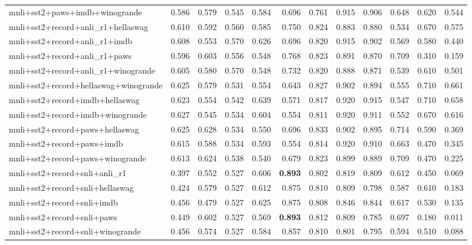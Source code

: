 \begin{table}[t]
\begin{tabular}{lrrrrrrrrrrr}
    mnli+sst2+paws+imdb+winogrande & 0.586 & 0.579 & 0.545 & 0.584 & 0.696 & 0.761 & 0.915 & 0.906 & 0.648 & 0.620 & 0.544 \\
    mnli+sst2+record+anli\_r1+hellaswag & 0.610 & 0.592 & 0.560 & 0.585 & 0.750 & 0.824 & 0.883 & 0.880 & 0.534 & 0.670 & 0.575 \\
    mnli+sst2+record+anli\_r1+imdb & 0.608 & 0.553 & 0.570 & 0.626 & 0.696 & 0.820 & 0.915 & 0.902 & 0.569 & 0.580 & 0.440 \\
    mnli+sst2+record+anli\_r1+paws & 0.596 & 0.603 & 0.556 & 0.548 & 0.768 & 0.823 & 0.891 & 0.870 & 0.709 & 0.310 & 0.159 \\
    mnli+sst2+record+anli\_r1+winogrande & 0.605 & 0.580 & 0.570 & 0.548 & 0.732 & 0.820 & 0.888 & 0.871 & 0.539 & 0.610 & 0.501 \\
    mnli+sst2+record+hellaswag+winogrande & 0.625 & 0.579 & 0.531 & 0.554 & 0.643 & 0.827 & 0.902 & 0.894 & 0.555 & 0.710 & 0.661 \\
    mnli+sst2+record+imdb+hellaswag & 0.623 & 0.554 & 0.542 & 0.639 & 0.571 & 0.817 & 0.920 & 0.915 & 0.547 & 0.710 & 0.658 \\
    mnli+sst2+record+imdb+winogrande & 0.627 & 0.545 & 0.534 & 0.604 & 0.554 & 0.811 & 0.920 & 0.911 & 0.552 & 0.670 & 0.616 \\
    mnli+sst2+record+paws+hellaswag & 0.625 & 0.628 & 0.534 & 0.550 & 0.696 & 0.833 & 0.902 & 0.895 & 0.714 & 0.590 & 0.369 \\
    mnli+sst2+record+paws+imdb & 0.615 & 0.588 & 0.534 & 0.593 & 0.554 & 0.814 & 0.920 & 0.910 & 0.663 & 0.470 & 0.345 \\
    mnli+sst2+record+paws+winogrande & 0.613 & 0.624 & 0.538 & 0.540 & 0.679 & 0.823 & 0.899 & 0.889 & 0.709 & 0.470 & 0.225 \\
    mnli+sst2+record+snli+anli\_r1 & 0.397 & 0.552 & 0.527 & 0.606 & \textbf{0.893} & 0.802 & 0.819 & 0.809 & 0.612 & 0.450 & 0.069 \\
    mnli+sst2+record+snli+hellaswag & 0.424 & 0.579 & 0.527 & 0.612 & 0.875 & 0.810 & 0.809 & 0.798 & 0.587 & 0.610 & 0.183 \\
    mnli+sst2+record+snli+imdb & 0.456 & 0.479 & 0.527 & 0.625 & 0.875 & 0.808 & 0.846 & 0.844 & 0.617 & 0.530 & 0.135 \\
    mnli+sst2+record+snli+paws & 0.449 & 0.602 & 0.527 & 0.569 & \textbf{0.893} & 0.812 & 0.809 & 0.785 & 0.697 & 0.180 & 0.011 \\
    mnli+sst2+record+snli+winogrande & 0.456 & 0.574 & 0.527 & 0.584 & 0.857 & 0.810 & 0.801 & 0.795 & 0.594 & 0.510 & 0.088 \\

\end{tabular}
\end{table}

